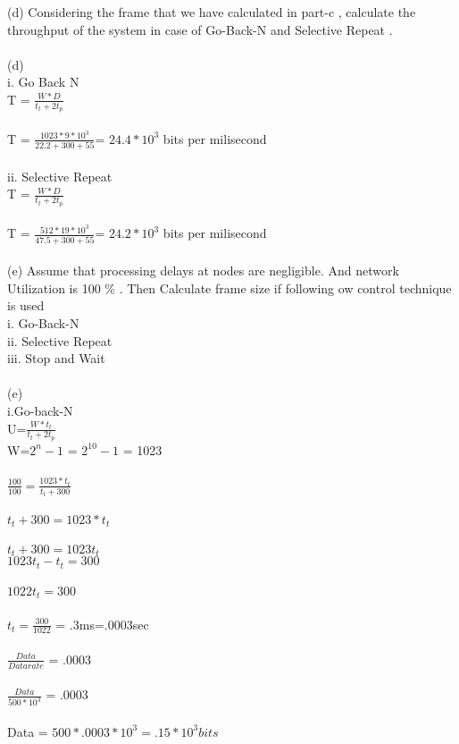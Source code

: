 \documentclass[a4paper,12pt]{article}
\begin{document}
(d) Considering the frame that we have calculated in part-c , calculate the throughput
of the system in case of Go-Back-N and Selective Repeat .\\\\
(d) \\
i. Go Back N\\
T = $\frac{W*D}{t_{t}+2t_{p}}$\\\\
T = $\frac{1023*9*10^3}{22.2+300+55}$= $24.4*10^3$ bits per milisecond\\\\
ii. Selective Repeat\\
T = $\frac{W*D}{t_{t}+2t_{p}}$\\\\
T = $\frac{512*19*10^3}{47.5+300+55}$= $24.2*10^3$ bits per milisecond\\\\
(e) Assume that processing delays at nodes are negligible. And network Utilization is
100 \% . Then Calculate frame size if following
ow control technique is used\\
i. Go-Back-N\\
ii. Selective Repeat\\
iii. Stop and Wait\\\\
(e)\\
i.Go-back-N\\
U=$\frac{W*t_{t}}{t_{t}+2t_{p}}$\\
W=$2^n-{1}$ = $2^{10}-1$ = 1023\\\\
$\frac{100}{100} = \frac{1023 * t_{t}}{t_{t}+300}$\\\\
$t_{t}+300=1023* t_{t}$\\\\
$t_{t} + 300 = 1023t_{t}$\\
$1023t_{t}-t_{t} = 300$\\\\
$1022t_{t}=300$\\\\
$t_{t} = \frac{300}{1022}$ = .3ms=.0003sec\\\\
$\frac{Data}{Datarate}$ = .0003\\\\
$\frac{Data}{500*10^3}$ = .0003\\\\
Data = $500*.0003*10^3= .15 * 10^3 bits$\\\\
\end{document}
